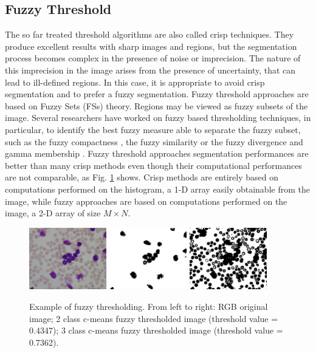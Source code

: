 \documentclass[final,a4paper,12pt,english]{UnicaPhdThesis3}
\begin{document}
\subsection{Fuzzy Threshold} %
The so far treated threshold algorithms are also called crisp techniques. They produce excellent results with sharp images and regions, but the segmentation process becomes complex in the presence of noise or imprecision. The nature of this imprecision in the image arises from the presence of uncertainty, that can lead to ill-defined regions. In this case, it is appropriate to avoid crisp segmentation and to prefer a fuzzy segmentation. Fuzzy threshold approaches are based on Fuzzy Sets (\acs{FS}s) theory. Regions may be viewed as fuzzy subsets of the image. Several researchers have worked on fuzzy based thresholding techniques, in particular, to identify the best fuzzy measure able to separate the fuzzy subset, such as the fuzzy compactness \cite{Pal}, the fuzzy similarity \cite{Ramar} or the fuzzy divergence and gamma membership \cite{Cha03, MeloP}.
Fuzzy threshold approaches segmentation performances are better than many crisp methods even though their computational performances are not comparable, as Fig. \ref{fig:fuzzy} shows. Crisp methods are entirely based on computations performed on the histogram, a 1-D array easily obtainable from the image, while fuzzy approaches are based on computations performed on the image, a 2-D array of size $M \times N$.

\begin{figure}[h]
	\centering
	\includegraphics[width=0.3\textwidth]{images/figcs_rgb}
	\includegraphics[width=0.3\textwidth]{images/fig_fuzzy1}
	\includegraphics[width=0.3\textwidth]{images/fig_fuzzy2}
	\caption{\label{fig:fuzzy}Example of fuzzy thresholding. From left to right: RGB original image; 2 class c-means fuzzy thresholded image (threshold value = 0.4347); 3 class c-means fuzzy thresholded image (threshold value = 0.7362).}
\end{figure}
\end{document}

